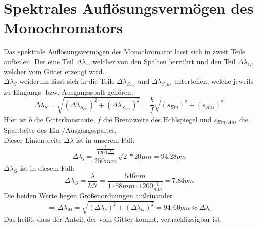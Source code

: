 

\section{Spektrales Auflösungsvermögen des Monochromators}

Das spektrale Auflösungsvermögen des Monochromator lasst sich in zweit Teile aufteilen. Der eine Teil $\Delta \lambda _{s}$, welcher von den Spalten herrührt und 
den Teil $\Delta \lambda_{G}$, welcher vom Gitter erzeugt wird.\\
$ \Delta \lambda_{S}$ weiderum lässt sich in die Teile $ \Delta \lambda_{S_{ein}}$ und $ \Delta \lambda_{S_aus}$ unterteilen, welche jeweils zu Eingangs- bzw. Ausgangsspalt gehören.
\begin{equation}
     \Delta \lambda_{S} = \sqrt{(\Delta \lambda_{S_{ein}})^{2}+(\Delta \lambda_{S_{aus}})^{2}} = \frac{b}{f} \sqrt{(s_{Ein})^{2}+(s_{Aus})^{2}} 
\end{equation}
Hier ist $b$ die Gitterkonstante, $f$ die Brennweite des Hohlspiegel und $s_{Ein/Aus}$ die Spaltbeite des Ein-/Ausgangsspaltes.\\
Dieser Linienbreite $\Delta\lambda$ ist in unserem Fall:
\begin{equation}
    \Delta \lambda_{s} =\frac{\frac{1}{1200\frac{1}{mm} } }{250mm}  \sqrt{2} * 20 \mu m = 94.28 pm
\end{equation}
$\Delta \lambda _{G}$ ist in diesem Fall:
\begin{equation}
    \Delta \lambda _{G} = \frac{\lambda }{kN} = \frac{546nm}{1 \cdot 58mm \cdot1200\frac{1}{mm} } = 7.84 pm
\end{equation}
Die beiden Werte liegen Größenordnungen außeinander. 
\begin{equation}
    \Rightarrow \Delta \lambda _{M} =\sqrt{(\Delta \lambda_{s} )^{2}+(\Delta \lambda_{G})^2 }  = 94,60pm \approx \Delta \lambda_{s} 
\end{equation}
Das heißt, dass der Anteil, der vom Gitter kommt, vernachlässigbar ist.
